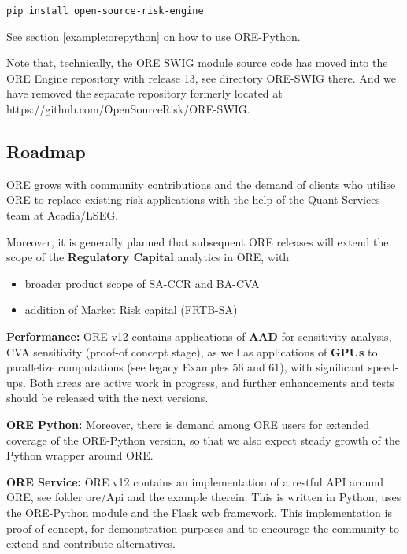 \medskip
\centerline{\tt pip install open-source-risk-engine}
 
\medskip
See section \ref{example:orepython} on how to use ORE-Python. 

\medskip
Note that, technically, the ORE SWIG module source code has moved into the ORE Engine repository with release 13, see directory ORE-SWIG there. And we have removed the separate repository formerly located at https://github.com/OpenSourceRisk/ORE-SWIG.

\subsection{Roadmap}

ORE grows with community contributions and the demand of clients who utilise ORE to replace existing risk applications with the help of the Quant Services team at Acadia/LSEG.

Moreover, it is generally planned that subsequent ORE releases will extend the scope of the {\bf Regulatory Capital} analytics in ORE, with
\begin{itemize}
\item broader product scope of SA-CCR and BA-CVA
\item addition of Market Risk capital (FRTB-SA)
\end{itemize}

{\bf Performance:} ORE v12 contains applications of {\bf AAD} for sensitivity analysis, CVA sensitivity (proof-of concept stage),
as well as applications of {\bf GPUs} to parallelize computations (see legacy Examples 56 and 61), with significant
speed-ups. Both areas are active work in progress, and further enhancements and tests should be released with the next versions.

{\bf ORE Python:} Moreover, there is demand among ORE users for extended coverage of the ORE-Python version, so that we also expect steady growth
of the Python wrapper around ORE.

{\bf ORE Service:} ORE v12 contains an implementation of a restful API around ORE, see folder ore/Api and the example therein.
This is written in Python, uses the ORE-Python module and the Flask web framework. This implementation is proof of concept,
for demonstration purposes and to encourage the community to extend and contribute alternatives.

